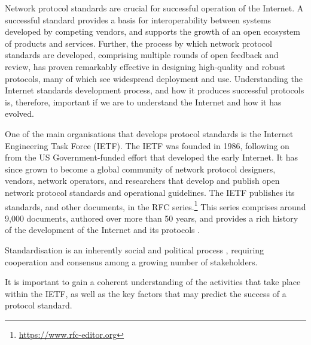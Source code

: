 \documentclass[twocolumn,10pt]{article}
\begin{document}

Network protocol standards are crucial for successful operation of the
Internet.  A successful standard provides a basis for interoperability
between systems developed by competing vendors, and supports the growth of
an open ecosystem of products and services. Further, the process by which
network protocol standards are developed, comprising multiple rounds of
open feedback and review, has proven remarkably effective in designing
high-quality and robust protocols, many of which see widespread deployment
and use. Understanding the Internet standards development process, and how
it produces successful protocols is, therefore, important if we are to
understand the Internet and how it has evolved.

One of the main organisations that develops protocol standards is the
Internet Engineering Task Force (IETF). The IETF was founded in 1986,
following on from the US Government-funded effort that developed the early
Internet. It has since grown to become a global community of network
protocol designers, vendors, network operators, and researchers that
develop and publish open network protocol standards and operational
guidelines.  The IETF publishes its standards, and other documents, in
the RFC series.\footnote{\url{https://www.rfc-editor.org}} This series
comprises around 9,000 documents, authored over more than 50 years,
and provides a rich history of the development of the Internet and
its protocols \cite{RFC8700}.



Standardisation is an inherently social and political process
\cite{RFC2026,RFC7282}, requiring cooperation and consensus among a growing
number of stakeholders.

It is important to gain a coherent understanding of the activities that
take place within the IETF, as well as the key factors that may predict
the success of a protocol standard.


\end{document}
